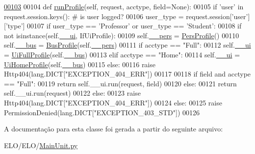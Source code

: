 \begin{DoxyCode}
\hypertarget{classELO_1_1MainUnit_1_1Factory_l00103}{}\hyperlink{classELO_1_1MainUnit_1_1Factory_ab20a76f74180fc77c6b8fcd8de7942f1}{00103} 
00104     \textcolor{keyword}{def }\hyperlink{classELO_1_1MainUnit_1_1Factory_ab20a76f74180fc77c6b8fcd8de7942f1}{runProfile}(self, request, acctype, field=None):
00105         \textcolor{keywordflow}{if} \textcolor{stringliteral}{'user'} \textcolor{keywordflow}{in} request.session.keys(): \textcolor{comment}{# is user logged?}
00106             user\_type = request.session[\textcolor{stringliteral}{'user'}][\textcolor{stringliteral}{'type'}]
00107             \textcolor{keywordflow}{if} user\_type == \textcolor{stringliteral}{'Professor'} \textcolor{keywordflow}{or} user\_type == \textcolor{stringliteral}{'Student'}:
00108                 \textcolor{keywordflow}{if} \textcolor{keywordflow}{not} isinstance(self.\hyperlink{classELO_1_1MainUnit_1_1Factory_a189a44a11e1a66ba69663eb2c598dd7c}{\_\_ui}, IfUiProfile):
00109                     self.\hyperlink{classELO_1_1MainUnit_1_1Factory_a68f6640ad3b515e1b8cd48d1554c0779}{\_\_pers} = \hyperlink{classProfile_1_1ProfileUnit_1_1PersProfile}{PersProfile}()
00110                     self.\hyperlink{classELO_1_1MainUnit_1_1Factory_a6a0b7b93046e095779ba54e0a8a4d02c}{\_\_bus} = \hyperlink{classProfile_1_1ProfileUnit_1_1BusProfile}{BusProfile}(self.\hyperlink{classELO_1_1MainUnit_1_1Factory_a68f6640ad3b515e1b8cd48d1554c0779}{\_\_pers})
00111                 \textcolor{keywordflow}{if} acctype == \textcolor{stringliteral}{"Full"}:
00112                     self.\hyperlink{classELO_1_1MainUnit_1_1Factory_a189a44a11e1a66ba69663eb2c598dd7c}{\_\_ui} = \hyperlink{classProfile_1_1ProfileUnit_1_1UiFullProfile}{UiFullProfile}(self.\hyperlink{classELO_1_1MainUnit_1_1Factory_a6a0b7b93046e095779ba54e0a8a4d02c}{\_\_bus})
00113                 \textcolor{keywordflow}{elif} acctype == \textcolor{stringliteral}{"Home"}:
00114                     self.\hyperlink{classELO_1_1MainUnit_1_1Factory_a189a44a11e1a66ba69663eb2c598dd7c}{\_\_ui} = \hyperlink{classProfile_1_1ProfileUnit_1_1UiHomeProfile}{UiHomeProfile}(self.\hyperlink{classELO_1_1MainUnit_1_1Factory_a6a0b7b93046e095779ba54e0a8a4d02c}{\_\_bus})
00115                 \textcolor{keywordflow}{else}:
00116                     \textcolor{keywordflow}{raise} Http404(lang.DICT[\textcolor{stringliteral}{"EXCEPTION\_404\_ERR"}])
00117             
00118                 \textcolor{keywordflow}{if} field \textcolor{keywordflow}{and} acctype == \textcolor{stringliteral}{"Full"}:
00119                     \textcolor{keywordflow}{return} self.\_\_ui.run(request, field)
00120                 \textcolor{keywordflow}{else}:
00121                     \textcolor{keywordflow}{return} self.\_\_ui.run(request)
00122             \textcolor{keywordflow}{else}:
00123                 \textcolor{keywordflow}{raise} Http404(lang.DICT[\textcolor{stringliteral}{"EXCEPTION\_404\_ERR"}])
00124         \textcolor{keywordflow}{else}:
00125             \textcolor{keywordflow}{raise} PermissionDenied(lang.DICT[\textcolor{stringliteral}{"EXCEPTION\_403\_STD"}])
00126         

\end{DoxyCode}


A documentação para esta classe foi gerada a partir do seguinte arquivo\-:\begin{DoxyCompactItemize}
\item 
E\-L\-O/\-E\-L\-O/\hyperlink{MainUnit_8py}{Main\-Unit.\-py}\end{DoxyCompactItemize}
